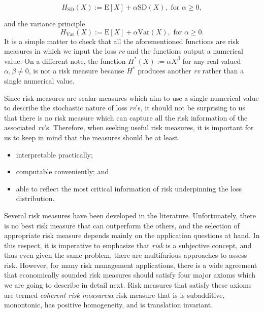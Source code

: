 \documentclass[]{book}
\providecommand{\tightlist}{%
  \setlength{\itemsep}{0pt}\setlength{\parskip}{0pt}}
\theoremstyle{definition}
\theoremstyle{definition}
\theoremstyle{definition}
\theoremstyle{remark}
\begin{document}
\begin{equation}
H_{\mathrm{SD}}(X):=\mathrm{E}[X]+\alpha \mathrm{SD}(X),\text{ for } \alpha\geq 0,
\label{eq:SD-principle} 
\end{equation}

and the variance principle \[
H_{\mathrm{Var}}(X):=\mathrm{E}[X]+\alpha \mathrm{Var}(X),\text{ for } \alpha\geq 0.
\] It is a simple matter to check that all the aforementioned functions
are risk measures in which we input the loss \emph{rv} and the functions
output a numerical value. On a different note, the function
\(H^{\ast}(X):=\alpha X^{\beta}\) for any real-valued
\(\alpha,\beta\neq 0\), is not a risk measure because \(H^{\ast}\)
produces another \emph{rv} rather than a single numerical value.

Since risk measures are scalar measures which aim to use a single
numerical value to describe the stochastic nature of loss \emph{rv}'s,
it should not be surprising to us that there is no risk measure which
can capture all the risk information of the associated \emph{rv}'s.
Therefore, when seeking useful risk measures, it is important for us to
keep in mind that the measures should be at least

\begin{itemize}
\tightlist
\item
  interpretable practically;\\
\item
  computable conveniently; and\\
\item
  able to reflect the most critical information of risk underpinning the
  loss distribution.
\end{itemize}

Several risk measures have been developed in the literature.
Unfortunately, there is no best risk measure that can outperform the
others, and the selection of appropriate risk measure depends mainly on
the application questions at hand. In this respect, it is imperative to
emphasize that \emph{risk} is a subjective concept, and thus even given
the same problem, there are multifarious approaches to assess risk.
However, for many risk management applications, there is a wide
agreement that economically sounded risk measures should satisfy four
major axioms which we are going to describe in detail next. Risk
measures that satisfy these axioms are termed \emph{coherent risk
measures}{a risk measure that is is subadditive, monontonic, has
positive homogeneity, and is translation invariant}.
\end{document}
